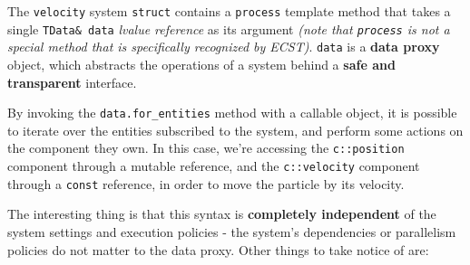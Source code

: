 \documentclass[oneside, 12pt, a4paper, openany]{book}
\begin{document}
The
\texttt{velocity}
system
\texttt{struct}
contains a
\texttt{process}
template method that takes a single
\texttt{TData& data}
\emph{lvalue reference} as its argument \emph{(note that
\texttt{process}
is not a special method that is specifically recognized by ECST)}.
\texttt{data}
is a \textbf{data proxy} object, which abstracts the operations of a
system behind a \textbf{safe and transparent} interface.

By invoking the
\texttt{data.for_entities}
method with a callable object, it is possible to iterate over the
entities subscribed to the system, and perform some actions on the
component they own. In this case, we're accessing the
\texttt{c::position}
component through a mutable reference, and the
\texttt{c::velocity}
component through a
\texttt{const}
reference, in order to move the particle by its velocity.

The interesting thing is that this syntax is \textbf{completely
independent} of the system settings and execution policies - the
system's dependencies or parallelism policies do not matter to the data
proxy. Other things to take notice of are:
\end{document}

